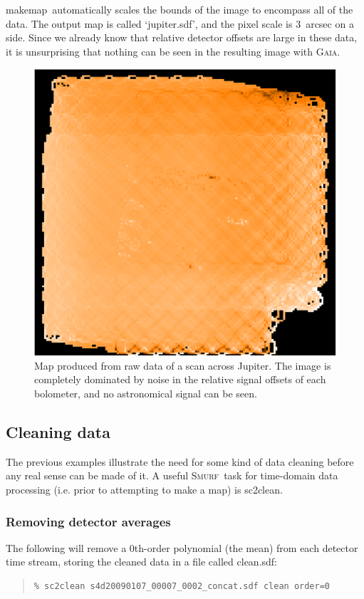 \documentclass[twoside,11pt]{article}
\newenvironment{myquote}{\begin{quote}\begin{small}}{\end{small}\end{quote}}
\newcommand{\gaia}{\xref{\textsc{Gaia}}{sun214}{}}
\newcommand{\smurf}{\xref{\textsc{Smurf}}{sun258}{}}
\newcommand{\task}[1]{\textsf{#1}}
\newcommand{\clean}{\xref{\task{sc2clean}}{sun258}{SC2CLEAN}}
\newcommand{\makemap}{\xref{\task{makemap}}{sun258}{MAKEMAP}}
\newcommand{\xref}[3]{#1}
\newcommand{\xlabel}[1]{}
\renewcommand{\_}{\texttt{\symbol{95}}}
\begin{document}
\makemap\ automatically scales the bounds of the image to encompass
all of the data. The output map is called `jupiter.sdf', and the pixel
scale is 3~arcsec on a side. Since we already know that relative
detector offsets are large in these data, it is unsurprising that
nothing can be seen in the resulting image with \gaia.

\begin{figure}
\begin{center}
\includegraphics[width=0.5\linewidth]{rawmap.eps}
\caption{Map produced from raw data of a scan across Jupiter. The
  image is completely dominated by noise in the relative signal
  offsets of each bolometer, and no astronomical signal can be seen.}
\label{fig:rawmap}
\end{center}
\end{figure}

\subsection{\xlabel{clean}Cleaning data} 

The previous examples illustrate the need for some kind of data
cleaning before any real sense can be made of it. A useful \smurf\
task for time-domain data processing (i.e. prior to attempting to make
a map) is \clean.

\subsubsection{\xlabel{clean_average}Removing detector averages} 

The following will remove a 0th-order polynomial (the mean) from each
detector time stream, storing the cleaned data in a file called clean.sdf:

\begin{myquote}
\begin{verbatim}
% sc2clean s4d20090107_00007_0002_concat.sdf clean order=0
\end{verbatim}
\end{myquote}
\end{document}

